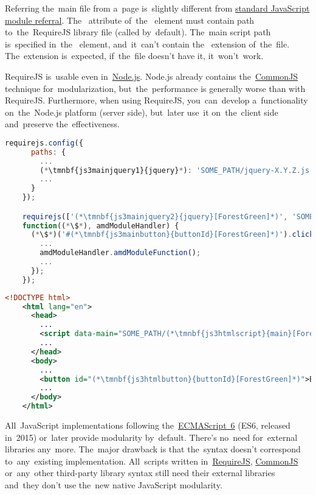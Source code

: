 Referring the~main file from a~page is~slightly different from \hyperref[javascriptmodularity]{standard JavaScript module referral}.
The~ attribute of~the~ element must contain path to~the~RequireJS library file (called  by~default).
The~main script path is~specified in~the~ element, and~it~can't contain the~ extension of~the~file.
The~extension is~expected, if~the~file doesn't have it, it~won't~work.

\note RequireJS is~usable even in~\hyperref[nodejs]{Node.js}.
Node.js already contains the~\hyperref[commonjs]{CommonJS} technique for~modularization, but~the~performance is generally worse than with RequireJS\@.
Furthermore, when using RequireJS, you~can~develop a~functionality on~the~Node.js platform (server side), but~later use~it on~the~client side and~preserve the~effectiveness.
\newpage

\begin{lstlisting}[language=JavaScript,title={Main JavaScript file \textit{\tmnbf{js3mainscript}{main}.js}}]
    requirejs.config({
      paths: {
        ...
        (*\tmnbf{js3mainjquery1}{jquery}*): 'SOME_PATH/jquery-X.Y.Z.js'
        ...
      }
    });

    requirejs(['(*\tmnbf{js3mainjquery2}{jquery}[ForestGreen]*)', 'SOME_PATH/amd_module'],
    function((*\$*), amdModuleHandler) {
      (*\$*)('#(*\tmnbf{js3mainbutton}{buttonId}[ForestGreen]*)').click(function() {
        ...
        amdModuleHandler.amdModuleFunction();
        ...
      });
    });
\end{lstlisting}
\begin{lstlisting}[language=XML,title={Web page file loading the JavaScript file}]
    <!DOCTYPE html>
    <html lang="en">
      <head>
        ...
        <script data-main="SOME_PATH/(*\tmnbf{js3htmlscript}{main}[ForestGreen]*)" src="SOME_OTHER_PATH/require.js"></script>
        ...
      </head>
      <body>
        ...
        <button id="(*\tmnbf{js3htmlbutton}{buttonId}[ForestGreen]*)">BUTTON_LABEL</button>
        ...
      </body>
    </html>
\end{lstlisting}
\newpage

All~JavaScript implementations following the~\hyperref[ecmascript]{ECMAScript~6} (ES6, released in~2015) or~later provide modularity by~default.
There's no~need for~external libraries any~more.
The~major drawback is that the~syntax doesn't correspond to~any~existing implementation.
All~scripts written in~\hyperref[requirejs]{RequireJS}, \hyperref[commonjs]{CommonJS} or~any~other third-party library syntax still need their external libraries and~they don't use the~new native JavaScript modularity.

\todo

\label{json}
